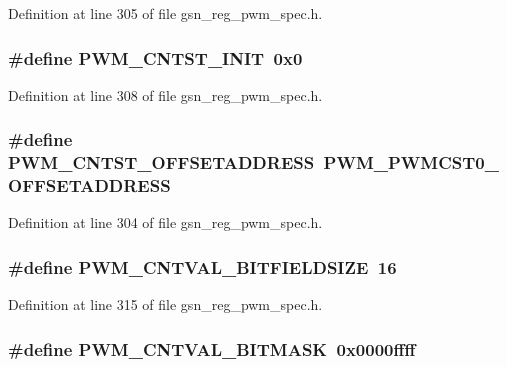 Definition at line 305 of file gsn\_\-reg\_\-pwm\_\-spec.h.

\hypertarget{a00565_a02fbeff375a01d36f329a146d4690ad4}{
\subsubsection[{PWM\_\-CNTST\_\-INIT}]{\setlength{\rightskip}{0pt plus 5cm}\#define PWM\_\-CNTST\_\-INIT~0x0}}
\label{a00565_a02fbeff375a01d36f329a146d4690ad4}


Definition at line 308 of file gsn\_\-reg\_\-pwm\_\-spec.h.

\hypertarget{a00565_ad80d9a60b1af1c534b6ab06c75d249ec}{
\subsubsection[{PWM\_\-CNTST\_\-OFFSETADDRESS}]{\setlength{\rightskip}{0pt plus 5cm}\#define PWM\_\-CNTST\_\-OFFSETADDRESS~PWM\_\-PWMCST0\_\-OFFSETADDRESS}}
\label{a00565_ad80d9a60b1af1c534b6ab06c75d249ec}


Definition at line 304 of file gsn\_\-reg\_\-pwm\_\-spec.h.

\hypertarget{a00565_a847c142d9f4ac4ec3fcd415aa67a3483}{
\subsubsection[{PWM\_\-CNTVAL\_\-BITFIELDSIZE}]{\setlength{\rightskip}{0pt plus 5cm}\#define PWM\_\-CNTVAL\_\-BITFIELDSIZE~16}}
\label{a00565_a847c142d9f4ac4ec3fcd415aa67a3483}


Definition at line 315 of file gsn\_\-reg\_\-pwm\_\-spec.h.

\hypertarget{a00565_af1714292b4b38e420ed93f69439e1a2c}{
\subsubsection[{PWM\_\-CNTVAL\_\-BITMASK}]{\setlength{\rightskip}{0pt plus 5cm}\#define PWM\_\-CNTVAL\_\-BITMASK~0x0000ffff}}
\label{a00565_af1714292b4b38e420ed93f69439e1a2c}


